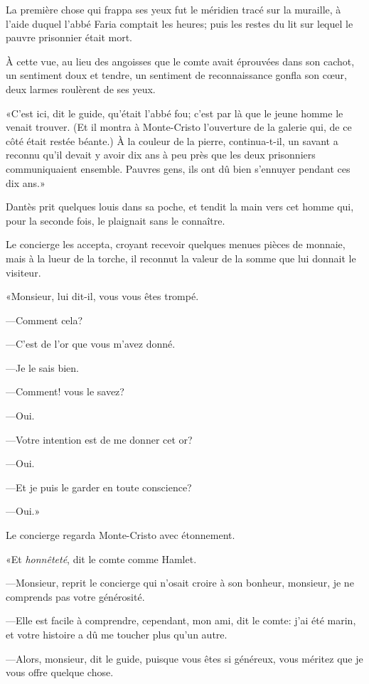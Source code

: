 La première chose qui frappa ses yeux fut le méridien tracé sur la muraille, à l'aide duquel l'abbé Faria comptait les heures; puis les restes du lit sur lequel le pauvre prisonnier était mort. 

À cette vue, au lieu des angoisses que le comte avait éprouvées dans son cachot, un sentiment doux et tendre, un sentiment de reconnaissance gonfla son cœur, deux larmes roulèrent de ses yeux. 

«C'est ici, dit le guide, qu'était l'abbé fou; c'est par là que le jeune homme le venait trouver. (Et il montra à Monte-Cristo l'ouverture de la galerie qui, de ce côté était restée béante.) À la couleur de la pierre, continua-t-il, un savant a reconnu qu'il devait y avoir dix ans à peu près que les deux prisonniers communiquaient ensemble. Pauvres gens, ils ont dû bien s'ennuyer pendant ces dix ans.» 

Dantès prit quelques louis dans sa poche, et tendit la main vers cet homme qui, pour la seconde fois, le plaignait sans le connaître. 

Le concierge les accepta, croyant recevoir quelques menues pièces de monnaie, mais à la lueur de la torche, il reconnut la valeur de la somme que lui donnait le visiteur. 

«Monsieur, lui dit-il, vous vous êtes trompé. 

—Comment cela? 

—C'est de l'or que vous m'avez donné. 

—Je le sais bien. 

—Comment! vous le savez? 

—Oui. 

—Votre intention est de me donner cet or? 

—Oui. 

—Et je puis le garder en toute conscience? 

—Oui.» 

Le concierge regarda Monte-Cristo avec étonnement. 

«Et \textit{honnêteté}, dit le comte comme Hamlet. 

—Monsieur, reprit le concierge qui n'osait croire à son bonheur, monsieur, je ne comprends pas votre générosité. 

—Elle est facile à comprendre, cependant, mon ami, dit le comte: j'ai été marin, et votre histoire a dû me toucher plus qu'un autre. 

—Alors, monsieur, dit le guide, puisque vous êtes si généreux, vous méritez que je vous offre quelque chose. 

